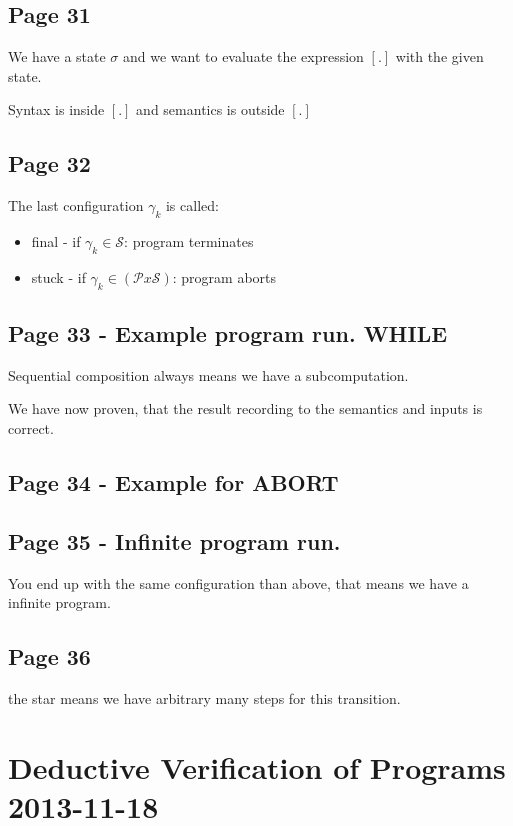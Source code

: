 \documentclass[a4paper]{article}
\begin{document}
\subsection{Page 31}
We have a state $\sigma$ and we want to evaluate the expression $[.]$ with
the given state.

Syntax is inside $[.]$ and semantics is outside $[.]$

\subsection{Page 32}
The last configuration $\gamma_k$ is called:
\begin{itemize}
\item final - if $\gamma_k \in \mathcal{S}$: program terminates
\item stuck - if $\gamma_k \in (\mathcal{P}x\mathcal{S})$: program aborts
\end{itemize}


\subsection{Page 33 - Example program run. WHILE}

Sequential composition always means we have a subcomputation.

We have now proven, that the result recording to the semantics and inputs is
correct.

\subsection{Page 34 - Example for ABORT}


\subsection{Page 35 - Infinite program run.}

You end up with the same configuration than above, that means we have a infinite
program.

\subsection{Page 36} the star means we have arbitrary many steps for this
transition.



\section{Deductive Verification of Programs 2013-11-18}
\end{document}
